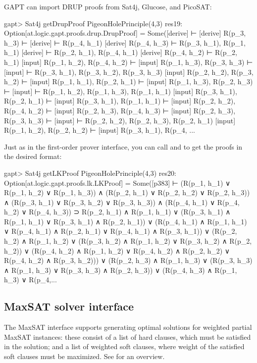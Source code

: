 \documentclass[a4paper,11pt]{article}
\newcommand{\cli}[1]{{\ttfamily {#1}}}
\begin{document}
GAPT can import DRUP proofs from Sat4j, Glucose, and PicoSAT:
\begin{clilisting}
gapt> Sat4j getDrupProof PigeonHolePrinciple(4,3)
res19: Option[at.logic.gapt.proofs.drup.DrupProof] =
Some([derive]  ⊢
[derive] R(p_3, h_3) ⊢
[derive]  ⊢ R(p_4, h_1)
[derive] R(p_4, h_3) ⊢ R(p_3, h_1), R(p_1, h_1)
[derive]  ⊢ R(p_2, h_1), R(p_4, h_1)
[derive] R(p_4, h_2) ⊢ R(p_2, h_1)
[input] R(p_1, h_2), R(p_4, h_2) ⊢
[input] R(p_1, h_3), R(p_3, h_3) ⊢
[input]  ⊢ R(p_3, h_1), R(p_3, h_2), R(p_3, h_3)
[input] R(p_2, h_2), R(p_3, h_2) ⊢
[input] R(p_1, h_1), R(p_2, h_1) ⊢
[input] R(p_1, h_3), R(p_2, h_3) ⊢
[input]  ⊢ R(p_1, h_2), R(p_1, h_3), R(p_1, h_1)
[input] R(p_3, h_1), R(p_2, h_1) ⊢
[input] R(p_3, h_1), R(p_1, h_1) ⊢
[input] R(p_2, h_2), R(p_4, h_2) ⊢
[input] R(p_2, h_3), R(p_4, h_3) ⊢
[input] R(p_2, h_3), R(p_3, h_3) ⊢
[input]  ⊢ R(p_2, h_2), R(p_2, h_3), R(p_2, h_1)
[input] R(p_1, h_2), R(p_2, h_2) ⊢
[input] R(p_3, h_1), R(p_4, ...
\end{clilisting}

Just as in the first-order prover interface, you can call
\cli{getResolutionProof} and \cli{getLKProof} to get the proofs in the desired
format:
\begin{clilisting}
gapt> Sat4j getLKProof PigeonHolePrinciple(4,3)
res20: Option[at.logic.gapt.proofs.lk.LKProof] =
Some([p383]
⊢
(R(p_1, h_1) ∨ R(p_1, h_2) ∨ R(p_1, h_3)) ∧
    (R(p_2, h_1) ∨ R(p_2, h_2) ∨ R(p_2, h_3)) ∧
    (R(p_3, h_1) ∨ R(p_3, h_2) ∨ R(p_3, h_3)) ∧
    (R(p_4, h_1) ∨ R(p_4, h_2) ∨ R(p_4, h_3)) ⊃
  R(p_2, h_1) ∧ R(p_1, h_1) ∨
    (R(p_3, h_1) ∧ R(p_1, h_1) ∨ R(p_3, h_1) ∧ R(p_2, h_1)) ∨
    (R(p_4, h_1) ∧ R(p_1, h_1) ∨
      R(p_4, h_1) ∧ R(p_2, h_1) ∨
      R(p_4, h_1) ∧ R(p_3, h_1)) ∨
    (R(p_2, h_2) ∧ R(p_1, h_2) ∨
      (R(p_3, h_2) ∧ R(p_1, h_2) ∨ R(p_3, h_2) ∧ R(p_2, h_2)) ∨
      (R(p_4, h_2) ∧ R(p_1, h_2) ∨
        R(p_4, h_2) ∧ R(p_2, h_2) ∨
        R(p_4, h_2) ∧ R(p_3, h_2))) ∨
    (R(p_2, h_3) ∧ R(p_1, h_3) ∨
      (R(p_3, h_3) ∧ R(p_1, h_3) ∨ R(p_3, h_3) ∧ R(p_2, h_3)) ∨
      (R(p_4, h_3) ∧ R(p_1, h_3) ∨
        R(p_4,...
\end{clilisting}

\subsection{MaxSAT solver interface}

The MaxSAT interface supports generating optimal solutions for weighted partial
MaxSAT instances: these consist of a list of hard clauses, which must be
satisfied in the solution; and a list of weighted soft clauses, where weight of
the satisfied soft clauses must be maximized.  See \cite{Argelich2008First}
for an overview.
\end{document}
